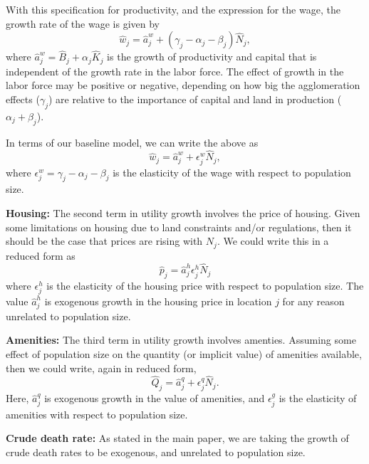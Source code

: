 \documentclass[10pt]{article}
\begin{document}
With this specification for productivity, and the expression for the wage, the growth rate of the wage is given by
\begin{equation}
    \hat{w}_j = \hat{a}^w_j + (\gamma_j - \alpha_j - \beta_j)\hat{N}_j,
\end{equation}
where $\hat{a}^w_j = \hat{B}_j + \alpha_j \hat{K}_j$ is the growth of productivity and capital that is independent of the growth rate in the labor force. The effect of growth in the labor force may be positive or negative, depending on how big the agglomeration effects ($\gamma_j$) are relative to the importance of capital and land in production ($\alpha_j + \beta_j$).

In terms of our baseline model, we can write the above as
\begin{equation}
    \hat{w}_j = \hat{a}^w_j + \epsilon^w_j \hat{N}_j,
\end{equation}
where $\epsilon^w_j = \gamma_j - \alpha_j - \beta_j$ is the elasticity of the wage with respect to population size.

\textbf{Housing:} The second term in utility growth involves the price of housing. Given some limitations on housing due to land constraints and/or regulations, then it should be the case that prices are rising with $N_j$. We could write this in a reduced form as
\begin{equation}
    \hat{p}_j = \hat{a}^h_j \epsilon_j^h \hat{N}_j
\end{equation}
where $\epsilon^h_j$ is the elasticity of the housing price with respect to population size. The value $\hat{a}^h_j$ is exogenous growth in the housing price in location $j$ for any reason unrelated to population size. 

\textbf{Amenities:} The third term in utility growth involves amenties. Assuming some effect of population size on the quantity (or implicit value) of amenities available, then we could write, again in reduced form,
\begin{equation}
    \hat{Q}_j = \hat{a}^q_j + \epsilon^q_j \hat{N}_j.
\end{equation}
Here, $\hat{a}^q_j$ is exogenous growth in the value of amenities, and $\epsilon^g_j$ is the elasticity of amenities with respect to population size. 

\textbf{Crude death rate:} As stated in the main paper, we are taking the growth of crude death rates to be exogenous, and unrelated to population size.
\end{document}
